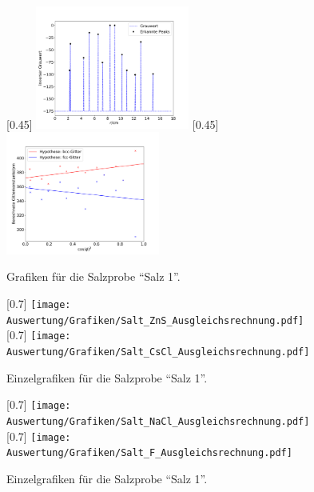 \begin{figure}[h!]
  \centering
  [0.45\textwidth]{
  \centering
  \includegraphics[width=0.45\textwidth]{Auswertung/Grafiken/Salt_Peaks.pdf}
  }
  [0.45\textwidth]{
  \centering
  \includegraphics[width=0.45\textwidth]{Auswertung/Grafiken/Salt_Ausgleichsrechnung.pdf}
  }\\
  \label{Abb:Salz_Plots}
  \caption{Grafiken für die Salzprobe \enquote{Salz 1}.}
\end{figure}

\begin{figure}[h!]
  \centering
  [0.7\textwidth]{
  \centering
  \texttt{[image: Auswertung/Grafiken/Salt\_ZnS\_Ausgleichsrechnung.pdf]}
  }\\
  [0.7\textwidth]{
  \centering
  \texttt{[image: Auswertung/Grafiken/Salt\_CsCl\_Ausgleichsrechnung.pdf]}
  }\\
  \label{Abb:Salz_Plotsa}
  \caption{Einzelgrafiken für die Salzprobe \enquote{Salz 1}.}
\end{figure}

\begin{figure}[h!]
  \centering
  [0.7\textwidth]{
  \centering
  \texttt{[image: Auswertung/Grafiken/Salt\_NaCl\_Ausgleichsrechnung.pdf]}
  }\\
  [0.7\textwidth]{
  \centering
  \texttt{[image: Auswertung/Grafiken/Salt\_F\_Ausgleichsrechnung.pdf]}
  }\\
  \label{Abb:Salz_Plotsn}
  \caption{Einzelgrafiken für die Salzprobe \enquote{Salz 1}.}
\end{figure}


